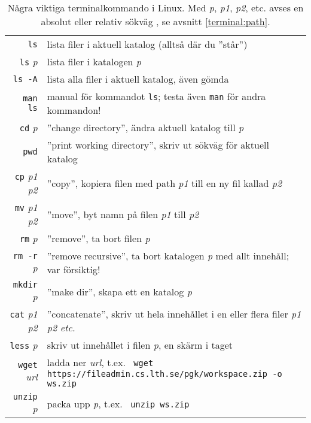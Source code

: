 \begin{table}[H]
\renewcommand{\arraystretch}{1.25}
   
\begin{tabular}{@{}r | l}
\texttt{ls} & lista filer i aktuell katalog (alltså där du ''står'')\\
\texttt{ls} \textit{p}  & lista filer i katalogen  \textit{p} \\
\texttt{ls -A} & lista alla filer i aktuell katalog, även gömda \\
\texttt{man ls} & manual för kommandot \texttt{ls}; testa även \texttt{man} för andra kommandon! \\
\texttt{cd} \textit{p} & ''change directory'', ändra aktuell katalog till \textit{p}\\
\texttt{pwd} & ''print working directory'', skriv ut sökväg för aktuell katalog \\
\texttt{cp} \textit{p1 p2} & ''copy'', kopiera filen med path \textit{p1} till en ny fil kallad \textit{p2} \\
\texttt{mv} \textit{p1 p2} & ''move'', byt namn på filen \textit{p1} till \textit{p2}  \\
\texttt{rm} \textit{p} & ''remove'', ta bort filen \textit{p}\\
\texttt{rm -r} \textit{p} & ''remove recursive'', ta bort katalogen \textit{p} med allt innehåll; var försiktig!\\
\texttt{mkdir} \textit{p} & ''make dir'', skapa ett en katalog \textit{p}\\
\texttt{cat} \textit{p1 p2}& ''concatenate'', skriv ut hela innehållet i en eller flera filer \textit{p1 p2 etc.}\\
\texttt{less} \textit{p}& skriv ut innehållet i filen \textit{p}, en skärm i taget\\
\texttt{wget} \textit{url}&ladda ner \textit{url}, t.ex. \texttt{ wget https://fileadmin.cs.lth.se/pgk/workspace.zip -o ws.zip}\\
\texttt{unzip} \textit{p}& packa upp \textit{p}, t.ex. \texttt{ unzip ws.zip}\\
\end{tabular}

    \caption{Några viktiga terminalkommando i Linux. Med \textit{p}, \textit{p1}, \textit{p2}, etc.  avses en absolut eller relativ sökväg , se avsnitt \ref{terminal:path}.}
    \label{fig:terminal:commands}

\end{table}

